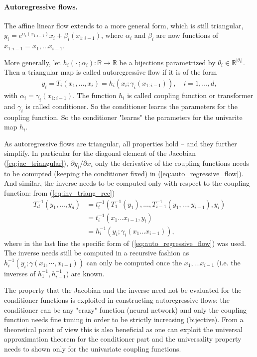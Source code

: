 \documentclass[12pt,a4paper]{article}
\begin{document}
\paragraph{Autoregressive flows.}
The affine linear flow extends to a more general form, which is still triangular, $y_{i} = e^{\alpha_{i}(x_{1:i-1})} x_{i} + \beta_i(x_{1:i-1})$, where $\alpha_{i}$ and $\beta_{i}$ are now functions of $x_{1:i-1} = x_1, \dots x_{i-1}$. 

More generally, let $h_i(\cdot\,; \alpha_i): \mathbb{R} \rightarrow \mathbb{R}$ be a bijections parametrized by $\theta_i \in \mathbb{R}^{|\theta_{i}|}$. Then a triangular map is called autoregressive flow if it is of the form 
\begin{align} \label{eq:auto_regressive_flow}
	y_i =T_i(x_1,\dots, x_i) = h_i(x_i; \gamma_i(x_{1:i-1})), \quad i=1,\dots,d, 
\end{align} 
with  $\alpha_i = \gamma_i(x_{1:i-1})$. The function $h_i$ is called coupling function or transformer and  $\gamma_i$ is called conditioner. So the conditioner learns the parameters for the coupling function. So the conditioner "learns" the parameters for the univarite map $h_i$. 

As autoregressive flows are triangular, all properties hold -- and they further simplify. In particular for the diagonal element of the Jacobian (\ref{eq:jac_triangular}), $\partial y_i / \partial x_i$ only the derivative of the coupling functions needs to be comupted (keeping the conditioner fixed) in (\ref{eq:auto_regressive_flow}). And similar, the inverse needs to be computed only with respect to the coupling function: from (\ref{eq:inv_triang_rec})
\begin{align}
	T_d^{-1}(y_1,\dots, y_d) 
	&= t_i^{-1}(T_1^{-1}(y_1), \dots, T_{i-1}^{-1}(y_1, \dots,y_{i-1} ), y_i) \nonumber \\ 
	&=t_i^{-1}(x_1\dots x_{i-1}, y_i) \nonumber \\
	&=h_i^{-1}(y_i; \gamma_i(x_1\dots x_{i-1})),
\end{align}
where in the last line the specific form of (\ref{eq:auto_regressive_flow}) was used. The inverse needs still be computed in a recursive fashion as $h_i^{-1}(y_i; \gamma(x_1, \cdots, x_{i-1}))$ can only be computed once the $x_1, \dots x_{i-1}$ (i.e. the inverses of  $h_1^{-1}, h_{i-1}^{-1}$) are known. 

The property that the Jacobian and the inverse need not be evaluated for the conditioner functions is exploited in constructing autoregressive flows: the conditioner can be any "crazy" function (neural network) and only the coupling function needs fine tuning in order to be strictly increasing (bijective). From a theoretical point of view this is also beneficial as one can exploit the universal approximation theorem for the conditioner part and the universality property needs to shown only for the univariate coupling functions. \cite{jaini_polynomial_flow_2019, wehenkel_unconstraint_monotonic_neural_networks, huang_2018_neural_autoregressive_flows}
\end{document}
